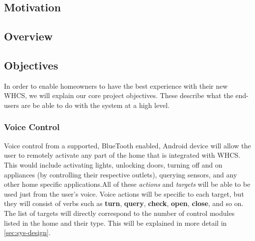 
\subsection{Motivation}


\subsection{Overview}


\subsection{Objectives}
In order to enable homeowners to have the best experience with their new WHCS,
we will explain our core project objectives. These describe what the end-users
are be able to do with the system at a high level.

\subsubsection{Voice Control}
Voice control from a supported, BlueTooth enabled, Android device will allow
the user to remotely activate any part of the home that is integrated with
WHCS. This would include activating lights, unlocking doors, turning off and on
appliances (by controlling their respective outlets), querying sensors, and any
other home specific applications.\footnotemark All of these \emph{actions} and
\emph{targets} will be able to be used just from the user's voice. Voice
actions will be specific to each target, but they will consist of verbs such as
\textbf{turn}, \textbf{query}, \textbf{check}, \textbf{open}, \textbf{close},
and so on. The list of targets will directly correspond to the number of
control modules listed in the home and their type.  This will be explained in
more detail in \autoref{sec:sys-design}.


